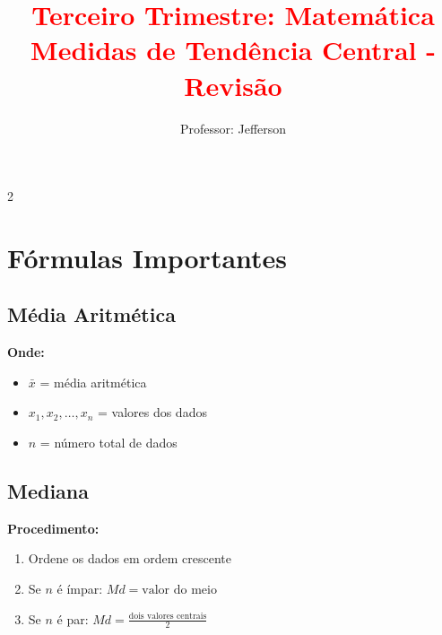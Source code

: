 \documentclass[11pt]{article}
\title{\textcolor{red}{Terceiro Trimestre: Matemática
    \\Medidas de Tendência Central - Revisão}}
\author{Professor: Jefferson}
\date{}
\begin{document}
\maketitle
\vspace{-1cm}


\begin{multicols}{2}

\section*{Fórmulas Importantes}

\subsection*{Média Aritmética}


\textbf{Onde:}
\begin{itemize}
\item $\bar{x}$ = média aritmética
\item $x_1, x_2, \ldots, x_n$ = valores dos dados
\item $n$ = número total de dados
\end{itemize}

\subsection*{Mediana}


\textbf{Procedimento:}
\begin{enumerate}
\item Ordene os dados em ordem crescente
\item Se $n$ é ímpar: $Md = \text{valor do meio}$
\item Se $n$ é par: $Md = \frac{\text{dois valores centrais}}{2}$
\end{enumerate}


\end{multicols}
\end{document}
